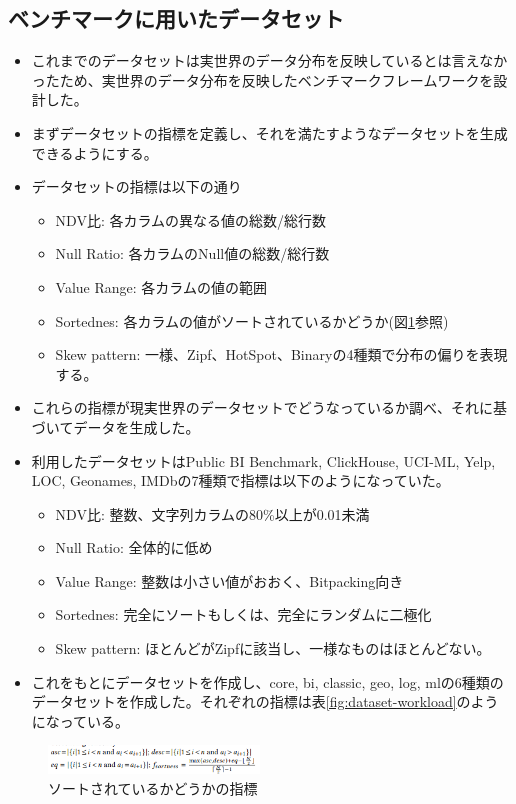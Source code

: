 \documentclass[uplatex]{jsarticle}
\theoremstyle{remark}
\begin{document}
\subsection{ベンチマークに用いたデータセット}
\begin{itemize}
  \item これまでのデータセットは実世界のデータ分布を反映しているとは言えなかったため、実世界のデータ分布を反映したベンチマークフレームワークを設計した。
  \item まずデータセットの指標を定義し、それを満たすようなデータセットを生成できるようにする。
  \item データセットの指標は以下の通り
  \begin{itemize}
    \item NDV比: 各カラムの異なる値の総数/総行数
    \item Null Ratio: 各カラムのNull値の総数/総行数
    \item Value Range: 各カラムの値の範囲
    \item Sortednes: 各カラムの値がソートされているかどうか(図\ref{fig:sortedness}参照)
    \item Skew pattern: 一様、Zipf、HotSpot、Binaryの4種類で分布の偏りを表現する。
  \end{itemize}
  \item これらの指標が現実世界のデータセットでどうなっているか調べ、それに基づいてデータを生成した。
  \item 利用したデータセットはPublic BI Benchmark, ClickHouse, UCI-ML, Yelp, LOC, Geonames, IMDbの7種類で指標は以下のようになっていた。
  \begin{itemize}
    \item NDV比: 整数、文字列カラムの80\%以上が0.01未満
    \item Null Ratio: 全体的に低め
    \item Value Range: 整数は小さい値がおおく、Bitpacking向き
    \item Sortednes: 完全にソートもしくは、完全にランダムに二極化
    \item Skew pattern: ほとんどがZipfに該当し、一様なものはほとんどない。
  \end{itemize}
  \item これをもとにデータセットを作成し、core, bi, classic, geo, log, mlの6種類のデータセットを作成した。それぞれの指標は表\ref{fig:dataset-workload}のようになっている。
\end{itemize}

\begin{figure}
  \centering
  \includegraphics[width=0.5\textwidth]{img/sortedness.png}
  \caption{ソートされているかどうかの指標}
  \label{fig:sortedness}
\end{figure}
\end{document}
